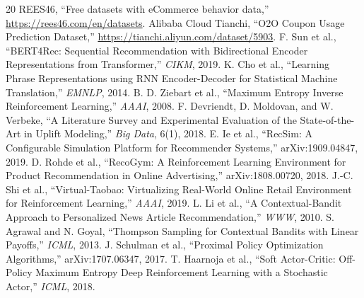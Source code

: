 \documentclass[9pt,twocolumn]{extarticle}
\begin{document}
\begingroup
\small
\setlength{\parindent}{0pt}
\begin{thebibliography}{20}
 REES46, ``Free datasets with eCommerce behavior data,'' \url{https://rees46.com/en/datasets}.
 Alibaba Cloud Tianchi, ``O2O Coupon Usage Prediction Dataset,'' \url{https://tianchi.aliyun.com/dataset/5903}.
 F. Sun et al., ``BERT4Rec: Sequential Recommendation with Bidirectional Encoder Representations from Transformer,'' \textit{CIKM}, 2019.
 K. Cho et al., ``Learning Phrase Representations using RNN Encoder-Decoder for Statistical Machine Translation,'' \textit{EMNLP}, 2014.
 B. D. Ziebart et al., ``Maximum Entropy Inverse Reinforcement Learning,'' \textit{AAAI}, 2008.
 F. Devriendt, D. Moldovan, and W. Verbeke, ``A Literature Survey and Experimental Evaluation of the State-of-the-Art in Uplift Modeling,'' \textit{Big Data}, 6(1), 2018.
 E. Ie et al., ``RecSim: A Configurable Simulation Platform for Recommender Systems,'' arXiv:1909.04847, 2019.
 D. Rohde et al., ``RecoGym: A Reinforcement Learning Environment for Product Recommendation in Online Advertising,'' arXiv:1808.00720, 2018.
 J.-C. Shi et al., ``Virtual-Taobao: Virtualizing Real-World Online Retail Environment for Reinforcement Learning,'' \textit{AAAI}, 2019.
 L. Li et al., ``A Contextual-Bandit Approach to Personalized News Article Recommendation,'' \textit{WWW}, 2010.
 S. Agrawal and N. Goyal, ``Thompson Sampling for Contextual Bandits with Linear Payoffs,'' \textit{ICML}, 2013.
 J. Schulman et al., ``Proximal Policy Optimization Algorithms,'' arXiv:1707.06347, 2017.
 T. Haarnoja et al., ``Soft Actor-Critic: Off-Policy Maximum Entropy Deep Reinforcement Learning with a Stochastic Actor,'' \textit{ICML}, 2018.
\end{thebibliography}
\endgroup
\end{document}
